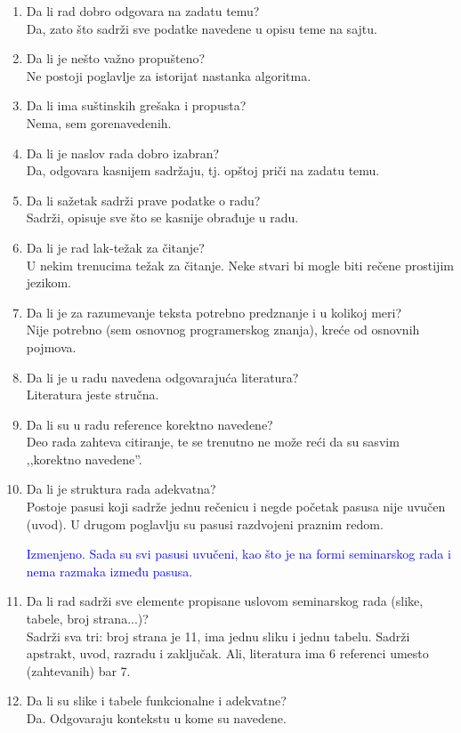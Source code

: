 \documentclass[a4paper]{report}
\newcommand{\odgovor}[1]{\textcolor{blue}{#1}}
\begin{document}
\begin{enumerate}
\item Da li rad dobro odgovara na zadatu temu?\\
Da, zato što sadrži sve podatke navedene u opisu teme na sajtu. 

\item Da li je nešto važno propušteno?\\
Ne postoji poglavlje za istorijat nastanka algoritma.

\item Da li ima suštinskih grešaka i propusta?\\
Nema, sem gorenavedenih.

\item Da li je naslov rada dobro izabran?\\
Da, odgovara kasnijem sadržaju, tj. opštoj priči na zadatu temu. 

\item Da li sažetak sadrži prave podatke o radu?\\
Sadrži, opisuje sve što se kasnije obrađuje u radu.

\item Da li je rad lak-težak za čitanje?\\
U nekim trenucima težak za čitanje. Neke stvari bi mogle biti rečene prostijim jezikom. 

\item Da li je za razumevanje teksta potrebno predznanje i u kolikoj meri?\\
Nije potrebno (sem osnovnog programerskog znanja), kreće od osnovnih pojmova. 

\item Da li je u radu navedena odgovarajuća literatura?\\
Literatura jeste stručna.

\item Da li su u radu reference korektno navedene?\\
Deo rada zahteva citiranje, te se trenutno ne može reći da su sasvim ,,korektno navedene''.

\item Da li je struktura rada adekvatna?\\
Postoje pasusi koji sadrže jednu rečenicu i negde početak pasusa nije uvučen (uvod). U drugom poglavlju su pasusi razdvojeni praznim redom.

\odgovor{Izmenjeno. Sada su svi pasusi uvučeni, kao što je na formi seminarskog rada i nema razmaka između pasusa.\\}
\item Da li rad sadrži sve elemente propisane uslovom seminarskog rada (slike, tabele, broj strana...)?\\
Sadrži sva tri: broj strana je 11, ima jednu sliku i jednu tabelu. Sadrži apstrakt, uvod, razradu i zaključak. Ali, literatura ima 6 referenci umesto (zahtevanih) bar 7.

\item Da li su slike i tabele funkcionalne i adekvatne?\\
Da. Odgovaraju kontekstu u kome su navedene.
\end{enumerate}
\end{document}
